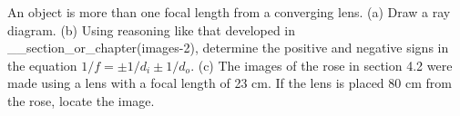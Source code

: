 \answercheck An object is more than one focal length from a
converging lens. (a) Draw a ray diagram. (b) Using reasoning
like that developed in __section_or_chapter(images-2), determine the
positive and negative signs in the equation $1/f=\pm1/d_i\pm1/d_o$. (c) The images
of the rose in section 4.2 were made using a lens with a
focal length of 23 cm. If the lens is placed 80 cm from the
rose, locate the image.
